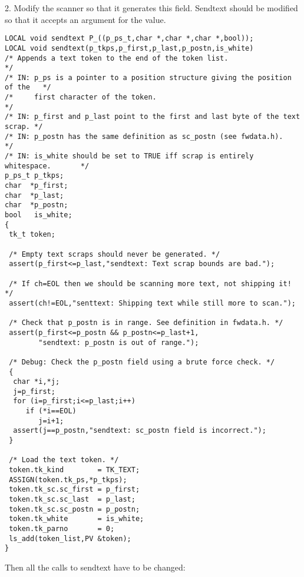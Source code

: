 2. Modify the scanner so that it generates this field.
Sendtext should be modified so that
it accepts an argument for the  value.

\begin{verbatim}
LOCAL void sendtext P_((p_ps_t,char *,char *,char *,bool));
LOCAL void sendtext(p_tkps,p_first,p_last,p_postn,is_white)
/* Appends a text token to the end of the token list.                         */
/* IN: p_ps is a pointer to a position structure giving the position of the   */
/*     first character of the token.                                          */
/* IN: p_first and p_last point to the first and last byte of the text scrap. */
/* IN: p_postn has the same definition as sc_postn (see fwdata.h).            */
/* IN: is_white should be set to TRUE iff scrap is entirely whitespace.       */
p_ps_t p_tkps;
char  *p_first;
char  *p_last;
char  *p_postn;
bool   is_white;
{
 tk_t token;
 
 /* Empty text scraps should never be generated. */
 assert(p_first<=p_last,"sendtext: Text scrap bounds are bad.");
 
 /* If ch=EOL then we should be scanning more text, not shipping it! */
 assert(ch!=EOL,"senttext: Shipping text while still more to scan.");

 /* Check that p_postn is in range. See definition in fwdata.h. */
 assert(p_first<=p_postn && p_postn<=p_last+1,
        "sendtext: p_postn is out of range.");
 
 /* Debug: Check the p_postn field using a brute force check. */
 {
  char *i,*j;
  j=p_first;
  for (i=p_first;i<=p_last;i++)
     if (*i==EOL)
        j=i+1;
  assert(j==p_postn,"sendtext: sc_postn field is incorrect.");
 }

 /* Load the text token. */
 token.tk_kind        = TK_TEXT;
 ASSIGN(token.tk_ps,*p_tkps);
 token.tk_sc.sc_first = p_first;
 token.tk_sc.sc_last  = p_last;
 token.tk_sc.sc_postn = p_postn;
 token.tk_white       = is_white;
 token.tk_parno       = 0;
 ls_add(token_list,PV &token);   
}
\end{verbatim}

Then all the calls to sendtext have to be changed:

